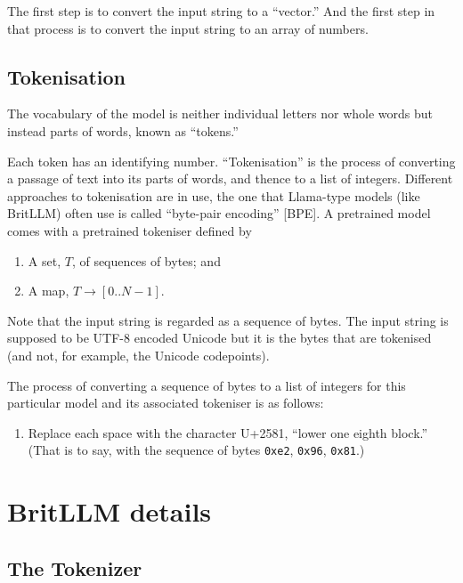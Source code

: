 \documentclass[11pt, a4paper]{article}
\begin{document}
The first step is to convert the input string to a ``vector.'' And the
first step in that process is to convert the input string to an array
of numbers.

\subsection{Tokenisation}

The vocabulary of the model is neither individual letters nor whole
words but instead parts of words, known as ``tokens.''

Each token has an identifying number. ``Tokenisation'' is the process
of converting a passage of text into its parts of words, and thence to
a list of integers. Different approaches to tokenisation are in use,
the one that Llama-type models (like BritLLM) often use is called
``byte-pair encoding'' [BPE]. A pretrained model comes with a
pretrained tokeniser defined
by
\begin{enumerate}
\item A set, $T$, of sequences of bytes; and
  \item A map, $T\to [0 .. N-1]$.
\end{enumerate}
Note that the input string is regarded as a sequence of bytes. The
input string is supposed to be UTF-8 encoded Unicode but it is the
bytes that are tokenised (and not, for example, the Unicode
codepoints).

The process of converting a sequence of bytes to a list of integers
for this particular model and its associated tokeniser is as follows:
\begin{enumerate}
\item Replace each space with the character U+2581, ``lower one eighth
  block.'' (That is to say, with the sequence of bytes \verb|0xe2|,
  \verb|0x96|, \verb|0x81|.)
\end{enumerate}



\appendix

\section{BritLLM details}

\subsection{The Tokenizer}
\end{document}
